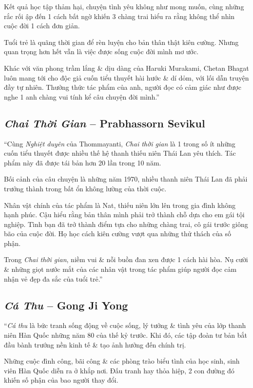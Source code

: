 \documentclass[oneside]{book}
\numberwithin{equation}{section}
\begin{document}
Kết quả học tập thảm hại, chuyện tình yêu không như mong muốn, cùng những rắc rối ập đến 1 cách bất ngờ khiến 3 chàng trai hiểu ra rằng không thể nhìn cuộc đời 1 cách đơn giản.

Tuổi trẻ là quãng thời gian để rèn luyện cho bản thân thật kiên cường. Nhưng quan trọng hơn hết vẫn là việc được sống cuộc đời mình mơ ước.

Khác với văn phong trầm lắng \& dịu dàng của Haruki Murakami, Chetan Bhagat luôn mang tới cho độc giả cuốn tiểu thuyết hài hước \& dí dỏm, với lối dẫn truyện đầy tự nhiên. Thưởng thức tác phẩm của anh, người đọc có cảm giác như được nghe 1 anh chàng vui tính kể câu chuyện đời mình.''

\subsection{\textit{Chai Thời Gian} -- Prabhassorn Sevikul}
``Cùng \textit{Nghiệt duyên} của Thommayanti, \textit{Chai thời gian} là 1 trong số ít những cuốn tiểu thuyết được nhiều thế hệ thanh thiếu niên Thái Lan yêu thích. Tác phẩm này đã được tái bản hơn 20 lần trong 10 năm.

Bối cảnh của câu chuyện là những năm 1970, nhiều thanh niên Thái Lan đã phải trưởng thành trong bất ổn không lường của thời cuộc.

Nhân vật chính của tác phẩm là Nat, thiếu niên lớn lên trong gia đình không hạnh phúc. Cậu hiểu rằng bản thân mình phải trở thành chỗ dựa cho em gái tội nghiệp. Tình bạn đã trở thành điểm tựa cho những chàng trai, cô gái trước giông bão của cuộc đời. Họ học cách kiên cường vượt qua những thử thách của số phận.

Trong \textit{Chai thời gian}, niềm vui \& nỗi buồn đan xen được 1 cách hài hòa. Nụ cười \& những giọt nước mắt của các nhân vật trong tác phẩm giúp người đọc cảm nhận vẻ đẹp đa sắc của tuổi trẻ.''

\subsection{\textit{Cá Thu} -- Gong Ji Yong}
``\textit{Cá thu} là bức tranh sống động về cuộc sống, lý tưởng \& tình yêu của lớp thanh niên Hàn Quốc những năm 80 của thế kỷ trước. Khi đó, các tập đoàn tư bản bắt đầu bành trướng nền kinh tế \& tạo ảnh hưởng đến chính trị.

Những cuộc đình công, bãi công \& các phòng trào biểu tình của học sinh, sinh viên Hàn Quốc diễn ra ở khắp nơi. Đấu tranh hay thỏa hiệp, 2 con đường đó khiến số phận của bao người thay đổi.
\end{document}
